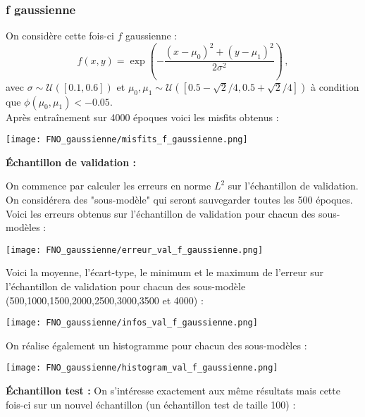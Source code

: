 \subsubsection{f gaussienne}

On considère cette fois-ci $f$ gaussienne :
$$f(x,y) = \exp\left(-\frac{(x-\mu_0)^2 + (y-\mu_1)^2}{2\sigma^2}\right)\,, $$ 
avec $\sigma \sim \mathcal{U}([0.1,0.6])$ et $\mu_0, \mu_1 \sim \mathcal{U}([0.5-\sqrt{2}/4, 0.5+\sqrt{2}/4])$ à condition que $\phi(\mu_0, \mu_1) < -0.05$. \\

Après entraînement sur 4000 époques voici les misfits obtenus : 

\begin{minipage}{\linewidth}
	\centering
	\texttt{[image: FNO\_gaussienne/misfits\_f\_gaussienne.png]}
\end{minipage}

\textbf{Échantillon de validation :}

On commence par calculer les erreurs en norme $L^2$ sur l'échantillon de validation. On considérera des "sous-modèle" qui seront sauvegarder toutes les 500 époques. Voici les erreurs obtenus sur l'échantillon de validation pour chacun des sous-modèles :

\begin{minipage}{\linewidth}
	\centering
	\texttt{[image: FNO\_gaussienne/erreur\_val\_f\_gaussienne.png]}
\end{minipage}

Voici la moyenne, l'écart-type, le minimum et le maximum de l'erreur sur l'échantillon de validation pour chacun des sous-modèle (500,1000,1500,2000,2500,3000,3500 et 4000) :

\begin{minipage}{\linewidth}
	\centering
	\texttt{[image: FNO\_gaussienne/infos\_val\_f\_gaussienne.png]}
\end{minipage}

On réalise également un histogramme pour chacun des sous-modèles : 

\begin{minipage}{\linewidth}
	\centering
	\texttt{[image: FNO\_gaussienne/histogram\_val\_f\_gaussienne.png]}
\end{minipage}

\textbf{Échantillon test :}
On s'intéresse exactement aux même résultats mais cette fois-ci sur un nouvel échantillon (un échantillon test de taille 100) :

